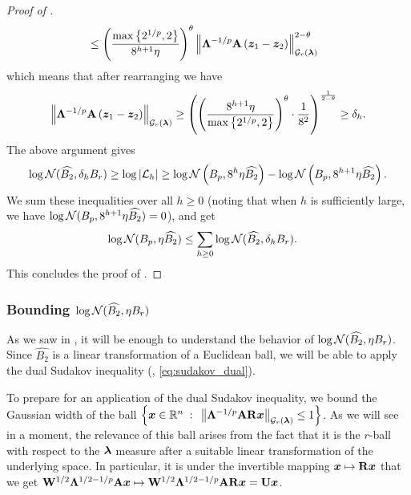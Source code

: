 \documentclass[11pt]{article}
\numberwithin{equation}{section}
\begin{document}
\begin{proof}[Proof of ]
\begin{align*}
    &\le \left(\frac{\max\left\{2^{1/p},2\right\}}{8^{h+1}\eta}\right)^{\theta}\left\lVert \mathbf{\Lambda}^{-1/p}\mathbf{A}\left(\bm{z}_1-\bm{z}_2\right) \right\rVert_{\mathcal{G}_{r}(\bm{\lambda})}^{2-\theta} 
\end{align*}
which means that after rearranging we have
\begin{align*}
    \left\lVert \mathbf{\Lambda}^{-1/p}\mathbf{A}\left(\bm{z}_1-\bm{z}_2\right) \right\rVert_{\mathcal{G}_{r}(\bm{\lambda})} \ge \left(\left(\frac{8^{h+1}\eta}{\max\left\{2^{1/p},2\right\}}\right)^{\theta} \cdot \frac{1}{8^2}\right)^{\frac{1}{2-\theta}} \ge \delta_h.
\end{align*}
The above argument gives
\begin{align*}
    \log\mathcal{N}(\widehat{B_2},\delta_h B_r) \ge \log\left\lvert \mathcal{L}_h \right\rvert \ge \log\mathcal{N}\left(B_p,8^h\eta\widehat{B_2}\right)-\log\mathcal{N}\left(B_p,8^{h+1}\eta\widehat{B_2}\right).
\end{align*}
We sum these inequalities over all $h \ge 0$ (noting that when $h$ is sufficiently large, we have $\log\mathcal{N}(B_p,8^{h+1} \eta \widehat{B_2})=0$), and get
\begin{align*}
    \log\mathcal{N}(B_p,\eta \widehat{B_2}) &\le \sum_{h\ge 0} \log\mathcal{N}(\widehat{B_2},\delta_hB_r).
\end{align*}
This concludes the proof of .
\end{proof}

\subsubsection{Bounding \texorpdfstring{$\log\mathcal{N}(\widehat{B_2},\eta B_r)$}{log N(\^{B2}, n Br)}}

As we saw in , it will be enough to understand the behavior of $\log\mathcal{N}(\widehat{B_2},\eta B_r)$. Since $\widehat{B_2}$ is a linear transformation of a Euclidean ball, we will be able to apply the dual Sudakov inequality (, \eqref{eq:sudakov_dual}).

To prepare for an application of the dual Sudakov inequality, we bound the Gaussian width of the ball $\left\{\bm{x} \in \mathbb{R}^n {\;\; : \;\;} \left\lVert \mathbf{\Lambda}^{-1/p}\mathbf{A}\mathbf{R}\bm{x} \right\rVert_{\mathcal{G}_{r}(\bm{\lambda})} \le 1\right\}$. As we will see in a moment, the relevance of this ball arises from the fact that it is the $r$-ball with respect to the $\bm{\lambda}$ measure after a suitable linear transformation of the underlying space. In particular, it is under the invertible mapping $\bm{x} \mapsto \mathbf{R}\bm{x}$ that we get $\mathbf{W}^{1/2}\mathbf{\Lambda}^{1/2-1/p}\mathbf{A}\bm{x} \mapsto \mathbf{W}^{1/2}\mathbf{\Lambda}^{1/2-1/p}\mathbf{A}\mathbf{R}\bm{x} = \mathbf{U}\bm{x}$.
\end{document}
